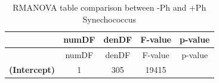 \documentclass[]{article}
\begin{document}
\begin{longtable}[]{@{}ccccc@{}}
\caption{RMANOVA table comparison between -Ph and +Ph
Synechococcus}\tabularnewline
\toprule
\begin{minipage}[b]{0.27\columnwidth}\centering\strut
~\strut
\end{minipage} & \begin{minipage}[b]{0.10\columnwidth}\centering\strut
numDF\strut
\end{minipage} & \begin{minipage}[b]{0.10\columnwidth}\centering\strut
denDF\strut
\end{minipage} & \begin{minipage}[b]{0.12\columnwidth}\centering\strut
F-value\strut
\end{minipage} & \begin{minipage}[b]{0.12\columnwidth}\centering\strut
p-value\strut
\end{minipage}\tabularnewline
\midrule
\endfirsthead
\toprule
\begin{minipage}[b]{0.27\columnwidth}\centering\strut
~\strut
\end{minipage} & \begin{minipage}[b]{0.10\columnwidth}\centering\strut
numDF\strut
\end{minipage} & \begin{minipage}[b]{0.10\columnwidth}\centering\strut
denDF\strut
\end{minipage} & \begin{minipage}[b]{0.12\columnwidth}\centering\strut
F-value\strut
\end{minipage} & \begin{minipage}[b]{0.12\columnwidth}\centering\strut
p-value\strut
\end{minipage}\tabularnewline
\midrule
\endhead
\begin{minipage}[t]{0.27\columnwidth}\centering\strut
\textbf{(Intercept)}\strut
\end{minipage} & \begin{minipage}[t]{0.10\columnwidth}\centering\strut
1\strut
\end{minipage} & \begin{minipage}[t]{0.10\columnwidth}\centering\strut
305\strut
\end{minipage} & \begin{minipage}[t]{0.12\columnwidth}\centering\strut
19415\strut
\end{minipage} & \begin{minipage}[t]{0.12\columnwidth}\centering\strut

\end{minipage}
\end{longtable}
\end{document}
